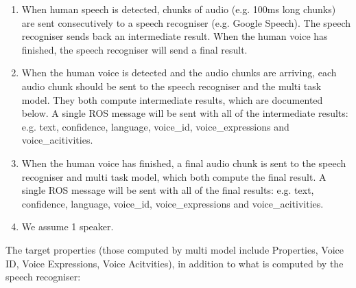 \begin{enumerate}
\item When human speech is detected, chunks of audio (e.g. 100ms long chunks) are sent consecutively to a speech recogniser (e.g. Google Speech). The speech recogniser sends back an intermediate result. When the human voice has finished, the speech recogniser will send a final result.
\item When the human voice is detected and the audio chunks are arriving, each audio chunk should be sent to the speech recogniser and the multi task model. They both compute intermediate results, which are documented below. A single ROS message will be sent with all of the intermediate results: e.g. text, confidence, language, voice\_id, voice\_expressions and voice\_acitivities.
\item When the human voice has finished, a final audio chunk is sent to the speech recogniser and multi task model, which both compute the final result. A single ROS message will be sent with all of the final results: e.g. text, confidence, language, voice\_id, voice\_expressions and voice\_acitivities.
\item We assume 1 speaker.
\end{enumerate}

The target properties (those computed by multi model include Properties, Voice ID, Voice Expressions, Voice Acitvities), in addition to what is computed by the speech recogniser:

